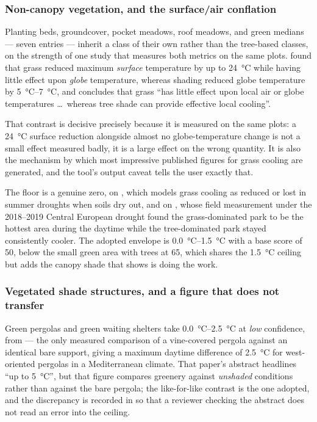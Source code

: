 \subsubsection{Non-canopy vegetation, and the surface/air conflation}
\label{sec:non-canopy}

Planting beds, groundcover, pocket meadows, roof meadows, and green medians ---
seven entries --- inherit a class of their own rather than the tree-based
classes, on the strength of one study that measures both metrics on the same
plots. \textcite{armson2012} found that grass reduced maximum \emph{surface}
temperature by up to \qty{24}{\degreeCelsius} while having little effect upon
\emph{globe} temperature, whereas shading reduced globe temperature by
\SIrange{5}{7}{\degreeCelsius}, and concludes that grass ``has little effect
upon local air or globe temperatures \dots\ whereas tree shade can provide
effective local cooling''.

That contrast is decisive precisely because it is measured on the same plots: a
\qty{24}{\degreeCelsius} surface reduction alongside almost no globe-temperature
change is not a small effect measured badly, it is a large effect on the wrong
quantity. It is also the mechanism by which most impressive published figures
for grass cooling are generated, and the tool's output caveat tells the user
exactly that.

The floor is a genuine zero, on \textcite{gill2013}, which models grass cooling
as reduced or lost in summer droughts when soils dry out, and on
\textcite{kraemer2022}, whose field measurement under the 2018--2019 Central
European drought found the grass-dominated park to be the hottest area during
the daytime while the tree-dominated park stayed consistently cooler. The
adopted envelope is \SIrange{0.0}{1.5}{\degreeCelsius} with a base score of 50,
below the small green area with trees at 65, which shares the
\qty{1.5}{\degreeCelsius} ceiling but adds the canopy shade that
\textcite{armson2012} shows is doing the work.

\subsubsection{Vegetated shade structures, and a figure that does not transfer}
\label{sec:shade-structure}

Green pergolas and green waiting shelters take
\SIrange{0.0}{2.5}{\degreeCelsius} at \emph{low} confidence, from
\textcite{chafer2020} --- the only measured comparison of a vine-covered
pergola against an identical bare support, giving a maximum daytime difference
of \qty{2.5}{\degreeCelsius} for west-oriented pergolas in a Mediterranean
climate. That paper's abstract headlines ``up to \qty{5}{\degreeCelsius}'', but
that figure compares greenery against \emph{unshaded} conditions rather than
against the bare pergola; the like-for-like contrast is the one adopted, and the
discrepancy is recorded in  so that a reviewer checking
the abstract does not read an error into the ceiling.

